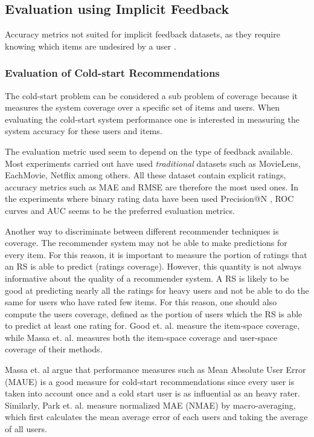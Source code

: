 \subsection{Evaluation using Implicit Feedback}

Accuracy metrics not suited for implicit feedback datasets, as they require knowing which items are undesired by a user \cite{Hu2008}.

\subsubsection{Evaluation of Cold-start Recommendations}

The cold-start problem can be considered a sub problem of coverage because it measures the system coverage over a specific set of items and users. When evaluating the cold-start system performance one is interested in measuring the system accuracy for these users and items.

The evaluation metric used seem to depend on the type of feedback available. Most experiments carried out have used \emph{traditional} datasets such as MovieLens, EachMovie, Netflix among others. All these dataset contain explicit ratings, accuracy metrics such as MAE \cite{Rashid2002, Rashid2008, Massa2004, Massa2007, Stern2009} and RMSE \cite{Agarwal2009, Agarwal2010} are therefore the most used ones. In the experiments where binary rating data have been used Precision@N \cite{Liu2011, Gantner2010}, ROC curves \cite{Agarwal2009, Gantner2010, Schein2002} and AUC \cite{Liu2011, Gantner2010} seems to be the preferred evaluation metrics.

Another way to discriminate between different recommender techniques is coverage. The recommender system may not be able to make predictions for every item. For this reason, it is important to measure the portion of ratings that an RS is able to predict (ratings coverage). However, this quantity is not always informative about the quality of a recommender system. A RS is likely to be good at predicting nearly all the ratings for heavy users and not be able to do the same for users who have rated few items. For this reason, one should also compute the users coverage, defined as the portion of users which the RS is able to predict at least one rating for. Good et. al. \cite{Good1999} measure the item-space coverage, while Massa et. al. \cite{Massa2004, Massa2007} measures both the item-space coverage and user-space coverage of their methods.

Massa et. al \cite{Massa2004} argue that performance measures such as Mean Absolute User Error (MAUE) is a good measure for cold-start recommendations since every user is taken into account once and a cold start user is as influential as an heavy rater. Similarly, Park et. al. \cite{Park2006} measure normalized MAE (NMAE) by macro-averaging, which first calculates the mean average error of each users and taking the average of all users.

